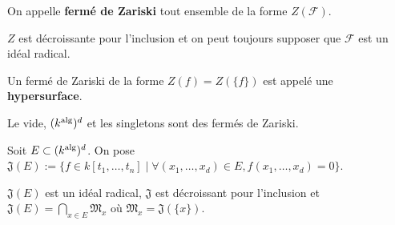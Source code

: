 	\begin{defn}
		On appelle \textbf{fermé de Zariski} tout ensemble de la forme $Z(\mathscr{F})$.
	\end{defn}
	
	\begin{rem}
		$Z$ est décroissante pour l'inclusion et on peut toujours supposer que $\mathscr{F}$ est un idéal radical.
	\end{rem}

	\begin{defn}
		Un fermé de Zariski de la forme $Z(f) = Z(\{ f \})$ est appelé une \textbf{hypersurface}.
	\end{defn}

	\begin{rem}
		Le vide, $(k^{\operatorname{alg}})^d$ et les singletons sont des fermés de Zariski.
	\end{rem}

	\begin{note}
		Soit $E \subset (k^{\operatorname{alg}})^d$.
		On pose $\mathfrak{J}(E) := \{ f \in k[t_1,\ldots,t_n] \mid \forall (x_1,\ldots,x_d) \in E, f(x_1,\ldots,x_d) = 0 \}$.
	\end{note}

	\begin{rem}
		$\mathfrak{J}(E)$ est un idéal radical, $\mathfrak{J}$ est décroissant pour l'inclusion et $\mathfrak{J}(E) = \bigcap_{x \in E} \mathfrak{M}_x$ où $\mathfrak{M}_x = \mathfrak{J}(\{ x \})$.
	\end{rem}
